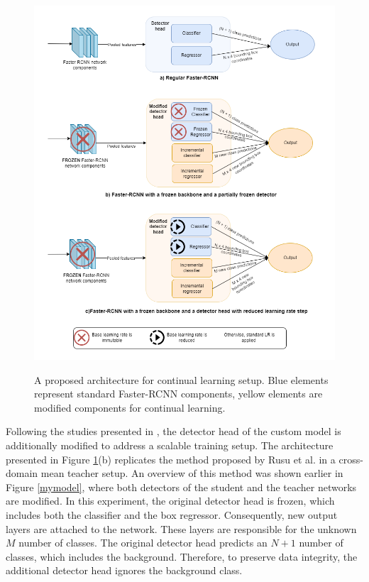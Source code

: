 \documentclass[english, 12pt, a4paper, elec, utf8, a-1b, online]{aaltothesis}
\begin{document}
\begin{figure}[htb]
	\begin{center}
		\includegraphics[width=16cm]{./FC.png}
	\end{center}
	\caption{A proposed architecture for continual learning setup. Blue elements represent standard Faster-RCNN components, yellow elements are modified components for continual learning.}
	\begin{center}
		\label{continualModel}
	\end{center}
\end{figure}
\FloatBarrier


Following the studies presented in , the detector head of the custom model is additionally modified to address a scalable training setup. The architecture presented in Figure \ref{continualModel}(b) replicates the method proposed by Rusu et al. \cite{Rusu2016} in a cross-domain mean teacher setup. An overview of this method was shown earlier in Figure \ref{mymodel}, where both detectors of the student and the teacher networks are modified. In this experiment, the original detector head is frozen, which includes both the classifier and the box regressor. Consequently, new output layers are attached to the network. These layers are responsible for the unknown $M$ number of classes. The original detector head predicts an $N+1$ number of classes, which includes the background. Therefore, to preserve data integrity, the additional detector head ignores the background class.  
\end{document}
